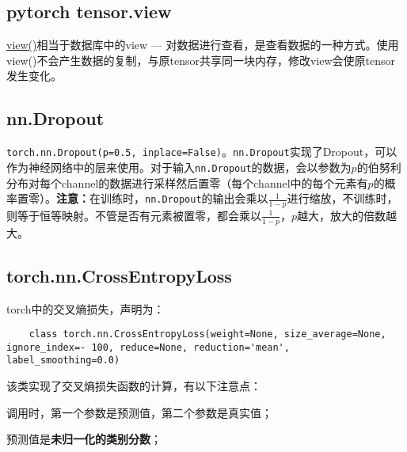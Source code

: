 \subsection{pytorch tensor.view}
\href{https://pytorch.org/docs/stable/tensor_view.html}{view()}相当于数据库中的view --- 对数据进行查看，是查看数据的一种方式。使用view()不会产生数据的复制，与原tensor共享同一块内存，修改view会使原tensor发生变化。

\subsection{nn.Dropout}\label{nn_dropout}
\texttt{torch.nn.Dropout(p=0.5, inplace=False)}。\texttt{nn.Dropout}实现了Dropout，可以作为神经网络中的层来使用。对于输入\texttt{nn.Dropout}的数据，会以参数为$p$的伯努利分布对每个channel的数据进行采样然后置零（每个channel中的每个元素有$p$的概率置零）。\textbf{注意：}在训练时，\texttt{nn.Dropout}的输出会乘以$\frac{1}{1 - p}$进行缩放，不训练时，则等于恒等映射。不管是否有元素被置零，都会乘以$\frac{1}{1 - p}$，$p$越大，放大的倍数越大。

\subsection{torch.nn.CrossEntropyLoss}
torch中的交叉熵损失，声明为：
\begin{verbatim}
	class torch.nn.CrossEntropyLoss(weight=None, size_average=None, ignore_index=- 100, reduce=None, reduction='mean', label_smoothing=0.0)
\end{verbatim}

该类实现了交叉熵损失函数的计算，有以下注意点：
\begin{myitemize}
	\item 调用时，第一个参数是预测值，第二个参数是真实值；
	\item 预测值是\textbf{未归一化的类别分数}；
\end{myitemize}
